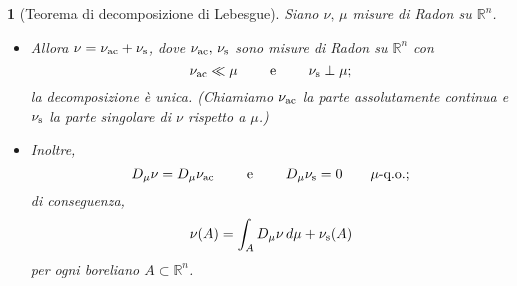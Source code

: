 \documentclass[a4paper,10pt,openright,oneside]{book}
\theoremstyle{theoremstyle}
\theoremstyle{theoremstylewoheader}
\newtheorem{teorema2}[teorema]{}
\theoremstyle{theoremstyle}
\theoremstyle{proofsecstyle}
\theoremstyle{nonumberplain}
\newcommand{\RR}{\ensuremath{\mathbb{R}}}
\newcommand{\Der}[2]{\ensuremath{D_#2 #1}}
\newcommand{\qo}[1]{\ensuremath{#1\text{-q.o.}}}
\begin{document}
\begin{teorema2}[Teorema di decomposizione di Lebesgue]
\label{thm:decomposizione_lebesgue}
Siano $\nu,\, \mu$ misure di Radon su $\RR^n$.
\begin{itemize}
\item[(i)] Allora $\nu = \nu_\textup{ac} + \nu_\textup{s}$, dove $\nu_\textup{ac},\, \nu_\textup{s}$ sono misure di Radon su $\RR^n$ con
\[
\nu_\textup{ac} \ll \mu \qquad\text{ e }\qquad \nu_\textup{s} \perp \mu;
\]
la decomposizione è unica. (Chiamiamo $\nu_\textup{ac}$ la \emph{parte assolutamente continua} e $\nu_\textup{s}$ la \emph{parte singolare} di $\nu$ rispetto a $\mu$.)
\item[(ii)] Inoltre,
\[
\Der{\nu}{\mu} = \Der{\nu_\textup{ac}}{\mu} \qquad\text{ e }\qquad \Der{\nu_\textup{s}}{\mu} = 0\qquad\qo{\mu};
\]
di conseguenza,
\[
\nu(A) = \int_A \Der{\nu}{\mu}\, d\mu + \nu_\textup{s}(A)
\]
per ogni boreliano $A \subset \RR^n$. %
\end{itemize}
\end{teorema2}
\end{document}
